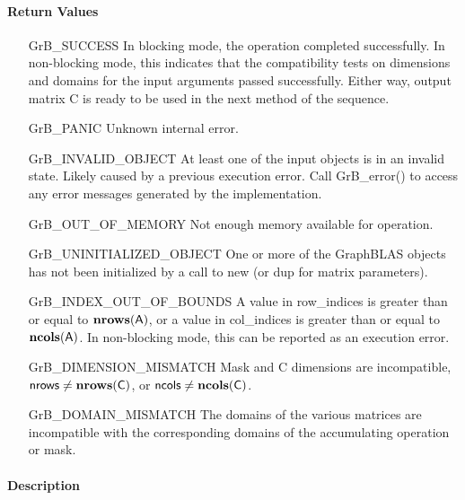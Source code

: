 \paragraph{Return Values}

\begin{itemize}[leftmargin=2.1in]
    \item[{\sf GrB\_SUCCESS}]         In blocking mode, the operation completed
    successfully. In non-blocking mode, this indicates that the compatibility 
    tests on dimensions and domains for the input arguments passed successfully. 
    Either way, output matrix {\sf C} is ready to be used in the next method of 
    the sequence.

    \item[{\sf GrB\_PANIC}]            Unknown internal error.
    
    \item[{\sf GrB\_INVALID\_OBJECT}] At least one of the input objects is in an invalid state.
	    Likely caused by a previous execution error.
    Call {\sf GrB\_error()} to access 
    any error messages generated by the implementation.

    \item[{\sf GrB\_OUT\_OF\_MEMORY}]  Not enough memory available for operation.
    
    \item[{\sf GrB\_UNINITIALIZED\_OBJECT}] One or more of the GraphBLAS objects 
    has not been initialized by a call to {\sf new} (or {\sf dup} for matrix
    parameters).

    \item[{\sf GrB\_INDEX\_OUT\_OF\_BOUNDS}]  A value in {\sf row\_indices} 
    is greater than or equal to $\bold{nrows}({\sf A})$, or a value in 
    {\sf col\_indices} is greater than or equal to $\bold{ncols}({\sf A})$.  In 
    non-blocking mode, this can be reported as an execution error.
    
    \item[{\sf GrB\_DIMENSION\_MISMATCH}] {\sf Mask} and {\sf C} dimensions are
    incompatible, ${\sf nrows} \neq \bold{nrows}({\sf C})$, or 
    ${\sf ncols} \neq \bold{ncols}({\sf C})$.

    \item[{\sf GrB\_DOMAIN\_MISMATCH}]     The domains of the various matrices
    are incompatible with the corresponding domains of the accumulating 
    operation or mask.
\end{itemize}

\paragraph{Description}

